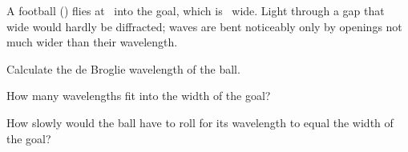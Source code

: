 A football (\mbO) flies at \vO\ into the goal, which is \wO\ wide. Light through a gap that wide would hardly be diffracted; waves are bent noticeably only by openings not much wider than their wavelength.

\begin{abcliste}
\abc Calculate the de Broglie wavelength of the ball.

\abc How many wavelengths fit into the width of the goal?

\abc How slowly would the ball have to roll for its wavelength to equal the width of the goal?
\end{abcliste}
